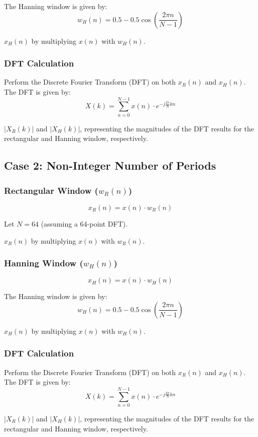 \documentclass{article}
\begin{document}
The Hanning window is given by:
\[ w_H(n) = 0.5 - 0.5 \cos\left(\frac{2\pi n}{N-1}\right) \]

 \( x_H(n) \) by multiplying \( x(n) \) with \( w_H(n) \).

\subsubsection*{DFT Calculation}
Perform the Discrete Fourier Transform (DFT) on both \( x_R(n) \) and \( x_H(n) \). The DFT is given by:
\[ X(k) = \sum_{n=0}^{N-1} x(n) \cdot e^{-j\frac{2\pi}{N}kn} \]

 \( |X_R(k)| \) and \( |X_H(k)| \), representing the magnitudes of the DFT results for the rectangular and Hanning window, respectively.

\subsection*{Case 2: Non-Integer Number of Periods}

\subsubsection*{Rectangular Window (\( w_R(n) \))}
\[ x_R(n) = x(n) \cdot w_R(n) \]

Let \( N = 64 \) (assuming a 64-point DFT).

 \( x_R(n) \) by multiplying \( x(n) \) with \( w_R(n) \).

\subsubsection*{Hanning Window (\( w_H(n) \))}
\[ x_H(n) = x(n) \cdot w_H(n) \]

The Hanning window is given by:
\[ w_H(n) = 0.5 - 0.5 \cos\left(\frac{2\pi n}{N-1}\right) \]

 \( x_H(n) \) by multiplying \( x(n) \) with \( w_H(n) \).

\subsubsection*{DFT Calculation}
Perform the Discrete Fourier Transform (DFT) on both \( x_R(n) \) and \( x_H(n) \). The DFT is given by:
\[ X(k) = \sum_{n=0}^{N-1} x(n) \cdot e^{-j\frac{2\pi}{N}kn} \]

 \( |X_R(k)| \) and \( |X_H(k)| \), representing the magnitudes of the DFT results for the rectangular and Hanning window, respectively.
\end{document}
